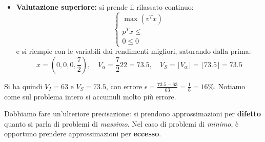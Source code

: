 \documentclass[a4paper,11pt]{article}
\begin{document}
\begin{itemize}
\begin{itemize}
		\item \textbf{Valutazione superiore:} si prende il rilassato continuo:
			\[
				\begin{cases}
					\max (v^T x) \\ 
					p^T x \leq \\ 
					0 \leq 0
				\end{cases}
			\]
			e si riempie con le variabili dai rendimenti migliori, saturando dalla prima:
			$$ x = \left( 0, 0, 0, \frac{7}{2} \right), \quad V_\alpha = \frac{7}{2} 22 = 73.5, \quad V_S = \lfloor V_\alpha \rfloor = \lfloor 73.5 \rfloor = 73.5 $$
	\end{itemize}
	Si ha quindi $V_I = 63$ e $V_S = 73.5$, con errore $\epsilon = \frac{73.5 - 63}{63} = \frac{1}{6} = 16\%$.
	Notiamo come sul problema intero si accumuli molto più errore.
\end{itemize}

Dobbiamo fare un'ulteriore precisazione: si prendono approssimazioni per \textbf{difetto} quanto si parla di problemi di \textit{massimo}.
Nel caso di problemi di \textit{minimo}, è opportuno prendere approssimazioni per \textbf{eccesso}.
\end{document}
